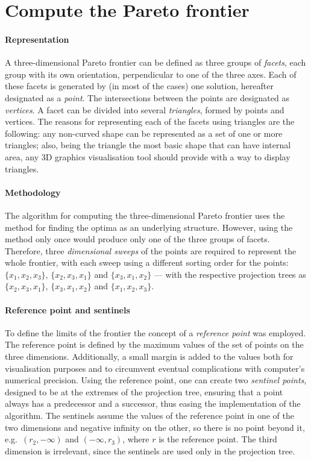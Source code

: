 \section{Compute the Pareto frontier}

\paragraph{Representation} A three-dimensional Pareto frontier can be defined as three groups of \textit{facets}, each group with its own orientation, perpendicular to one of the three axes. Each of these facets is generated by (in most of the cases) one solution, hereafter designated as a \textit{point}. The intersections between the points are designated as \textit{vertices}. A facet can be divided into several \textit{triangles}, formed by points and vertices. The reasons for representing each of the facets using triangles are the following: any non-curved shape can be represented as a set of one or more triangles; also, being the triangle the most basic shape that can have internal area, any 3D graphics visualisation tool should provide with a way to display triangles.

\paragraph{Methodology} The algorithm for computing the three-dimensional Pareto frontier uses the method for finding the optima as an underlying structure. However, using the method only once would produce only one of the three groups of facets. Therefore, three \textit{dimensional sweeps} of the points are required to represent the whole frontier, with each sweep using a different sorting order for the points: $\{x_1,x_2,x_3\}$, $\{x_2,x_3,x_1\}$ and $\{x_3,x_1,x_2\}$ --- with the respective projection trees as $\{x_2,x_3,x_1\}$, $\{x_3,x_1,x_2\}$ and $\{x_1,x_2,x_3\}$.

\paragraph{Reference point and sentinels} To define the limits of the frontier the concept of a \textit{reference point} was employed. The reference point is defined by the maximum values of the set of points on the three dimensions. Additionally, a small margin is added to the values both for visualisation purposes and to circumvent eventual complications with computer's numerical precision. Using the reference point, one can create two \textit{sentinel points}, designed to be at the extremes of the projection tree, ensuring that a point always has a predecessor and a successor, thus easing the implementation of the algorithm. The sentinels assume the values of the reference point in one of the two dimensions and negative infinity on the other, so there is no point beyond it, e.g.\ $(r_2,-\infty)$ and $(-\infty,r_3)$, where $r$ is the reference point. The third dimension is irrelevant, since the sentinels are used only in the projection tree.


